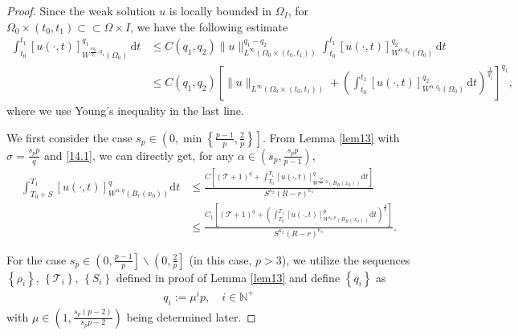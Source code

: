 \documentclass[reqno,10pt]{amsart}
\numberwithin{equation}{section}
\begin{document}
\begin{proof}
	Since the weak solution $u$ is locally bounded in $\Omega_I$, for $\Omega_0\times(t_0,t_1)\subset\subset\Omega\times I$, we have the following estimate
	\begin{align}
		\label{14.1}
		\int_{t_0}^{t_1}[u(\cdot,t)]^{q_1}_{W^{\frac{\alpha q_2}{q_1},q_1}(\Omega_0)}\,\mathrm{d}t&\le C(q_1,q_2)\|u\|^{q_1-q_2}_{L^\infty\left(\Omega_0\times(t_0,t_1)\right)}\int_{t_0}^{t_1}[u(\cdot,t)]^{q_2}_{W^{\alpha,q_2}(\Omega_0)}\,\mathrm{d}t\nonumber\\
		&\le C(q_1,q_2)\left[\|u\|_{L^\infty\left(\Omega_0\times(t_0,t_1)\right)}+\left( \int_{t_0}^{t_1}[u(\cdot,t)]^{q_2}_{W^{\alpha,q_2}(\Omega_0)}\,\mathrm{d}t\right)^{\frac{1}{q_2}}\right]^{q_1},
	\end{align}
	where we use Young's inequality in the last line.
	
	We first consider the case $s_p\in\left(0,\min\left\lbrace\frac{p-1}{p},\frac{2}{p}\right\rbrace \right]$. From Lemma \ref{lem13} with $\sigma=\frac{s_pp}{q}$ and \eqref{14.1}, we can directly get, for any $\alpha\in \left(s_p,\frac{s_pp}{p-1}\right)$,
	\begin{align*}
		\int_{T_0+S}^{T_1}[u(\cdot,t)]^q_{W^{\alpha,q}\left( B_r(x_0)\right) }\mathrm{d}t&\le\frac{C\left[\left(\mathcal{T}+1\right)^q+\int_{T_0}^{T_1}[u(\cdot,t)]^q_{W^{\frac{s_pp}{q},q}\left( B_R(x_0)\right)}\mathrm{d}t\right]}{S^{\kappa_2}(R-r)^{\kappa_1}}\\
		&\le \frac{C_1\left[\left(\mathcal{T}+1\right)^q+\left( \int_{T_0}^{T_1}[u(\cdot,t)]^p_{W^{s_p,p}\left( B_R(x_0)\right)}\mathrm{d}t\right) ^{\frac{q}{p}}\right]}{S^{\kappa_2}(R-r)^{\kappa_1}}.
	\end{align*}
	
	For the case $s_p\in\left(0,\frac{p-1}{p}\right]\backslash\left(0,\frac{2}{p}\right]$ (in this case, $p>3$), we utilize the sequences $\left\lbrace \rho_i\right\rbrace $, $\left\lbrace \mathcal{T}_i\right\rbrace $, $\left\lbrace S_i\right\rbrace $ defined in proof of Lemma \ref{lem13} and define $\left\lbrace q_i\right\rbrace$ as 
	\begin{align*}
		q_i:=\mu^ip,\quad i\in\mathbb{N}^+
	\end{align*}
	with $\mu\in\left(1,\frac{s_p(p-2)}{s_pp-2}\right)$ being determined later.
	

\end{proof}
\end{document}

